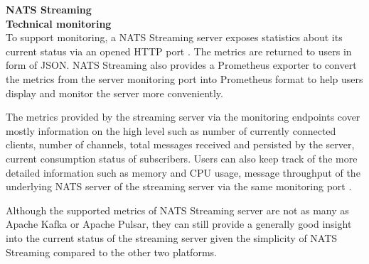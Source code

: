 \large \textbf{NATS Streaming}\\
\normalsize
\textbf{Technical monitoring}\\
To support monitoring, a NATS Streaming server exposes statistics about its current status via an opened HTTP port \cite{natsmonitoring}. The metrics are returned to users in form of JSON. NATS Streaming also provides a Prometheus exporter to convert the metrics from the server monitoring port into Prometheus format to help users display and monitor the server more conveniently. 

The metrics provided by the streaming server via the monitoring endpoints cover mostly information on the high level such as number of currently connected clients, number of channels, total messages received and persisted by the server, current consumption status of subscribers. Users can also keep track of the more detailed information such as memory and CPU usage, message throughput of the underlying NATS server of the streaming server via the same monitoring port \cite{normalnatsconfig}. 

Although the supported metrics of NATS Streaming server are not as many as Apache Kafka or Apache Pulsar, they can still provide a generally good insight into the current status of the streaming server given the simplicity of NATS Streaming compared to the other two platforms.

